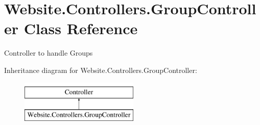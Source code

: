 \hypertarget{class_website_1_1_controllers_1_1_group_controller}{}\section{Website.\+Controllers.\+Group\+Controller Class Reference}
\label{class_website_1_1_controllers_1_1_group_controller}


Controller to handle Groups  


Inheritance diagram for Website.\+Controllers.\+Group\+Controller\+:\begin{figure}[H]
\begin{center}
\leavevmode
\includegraphics[height=2.000000cm]{class_website_1_1_controllers_1_1_group_controller}
\end{center}
\end{figure}
